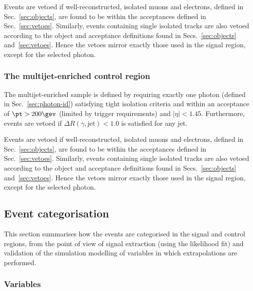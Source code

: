 Events are vetoed if well-reconstructed, isolated muons and electrons,
defined in Sec.~\ref{sec:objects}, are found to be within the
acceptances defined in Sec.~\ref{sec:vetoes}. Similarly, events
containing single isolated tracks are also vetoed according to the
object and acceptance definitions found in Secs.~\ref{sec:objects}
and~\ref{sec:vetoes}. Hence the vetoes mirror exactly those used in
the signal region, except for the selected photon.

\subsubsection{The multijet-enriched control region}
\label{sec:multijetcontrolSelection}

The multijet-enriched sample is defined by requiring exactly one
photon (defined in Sec.~\ref{sec:photon-id}) satisfying tight
isolation criteria and within an acceptance of $\pt > 200\gev$
(limited by trigger requirements) and $|\eta| < 1.45$. Furthermore,
events are vetoed if $\Delta R(\gamma,\textrm{jet}) < 1.0$ is
satisfied for any jet.

Events are vetoed if well-reconstructed, isolated muons and electrons,
defined in Sec.~\ref{sec:objects}, are found to be within the
acceptances defined in Sec.~\ref{sec:vetoes}. Similarly, events
containing single isolated tracks are also vetoed according to the
object and acceptance definitions found in Secs.~\ref{sec:objects}
and~\ref{sec:vetoes}. Hence the vetoes mirror exactly those used in
the signal region, except for the selected photon.

\subsection{Event categorisation}
\label{sec:event-categorisation}

This section summarises how the events are categorised in the signal
and control regions, from the point of view of signal extraction
(using the likelihood fit) and validation of the simulation modelling
of variables in which extrapolations are performed.

\subsubsection{Variables}

